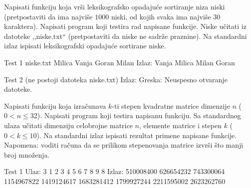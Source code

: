 \begin{Exercise}[label=326]
Napisati funkciju koja vrši leksikografsko opadajuće
sortiranje niza niski (pretpostaviti da ima najviše $1000$
niski, od kojih svaka ima najviše $30$ karaktera). Napisati
program koji testira rad napisane funkcije. Niske  učitati iz
datoteke ,,niske.txt`` (pretpostaviti da niske ne 
sadrže praznine). Na standardni izlaz ispisati
leksikografski opadajuće sortirane niske.

\begin{minitest}
\begin{test}{Test 1}
niske.txt Milica        	   
          Vanja
          Goran
          Milan 		  
Izlaz:    Vanja
          Milica
          Milan
          Goran
\end{test}
\end{minitest}
\begin{maxitest}
\begin{test}{Test 2}
(ne postoji datoteka niske.txt)		  
Izlaz: Greska: Neuspesno otvaranje datoteke.
\end{test}
\end{maxitest}
\end{Exercise}
\begin{Answer}[ref=326] 
\end{Answer}

\begin{Exercise}[label=327]
Napisati funkciju koja izračunava $k$-ti stepen kvadratne
matrice dimenzije $n$ ($0 < n \leq 32$). Napisati program koji
testira napisanu funkciju. Sa standardnog ulaza učitati
dimenziju celobrojne matrice $n$, elemente matrice i stepen
$k$ ($0 < k \leq 10$). Na standardni izlaz ispisati rezultat
primene napisane funkcije. Napomena: voditi računa da se
prilikom stepenovanja matrice izvrši što manji broj
množenja.

\begin{maxitest}
\begin{test}{Test 1}
Ulaz:  3
       1 2 3
       4 5 6
       7 8 9
       8
Izlaz: 510008400 626654232 743300064
       1154967822 1419124617 1683281412
       1799927244 2211595002 2623262760
\end{test}
\end{maxitest}
\end{Exercise}
\begin{Answer}[ref=327]
\end{Answer}

